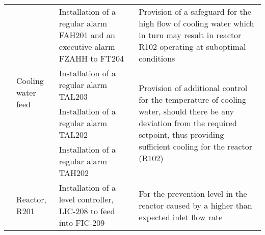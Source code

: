 \begin{table}[h]
\begin{tabularx}{\linewidth}{@{}lp{3cm}XX@{}}
     & \multirow[t]{4}{*}{Cooling water feed}        & Installation of a regular alarm FAH201 and an executive alarm FZAHH to FT204                                                                                  & Provision of a safeguard for the high flow of cooling water which in turn may result in   reactor R102 operating at suboptimal conditions                                                                 \\ \cmidrule(l){3-4} 
     &                                            & Installation of a regular alarm TAL203                                                                                                                        & \multirow[t]{3}{X}{Provision of additional control for the temperature of cooling water, should there be any deviation from the required setpoint, thus providing sufficient cooling for the reactor (R102)} \\ \cmidrule(lr){3-3}
     &                                            & Installation of a regular alarm TAL202                                                                                                                        &                                                                                                                                                                                                                                                         \\
     &                                            & Installation of a regular alarm TAH202                                                                                                                        &                                                                                                                                                                                                                                                         \\ \cmidrule(l){2-4} 
     & \multirow[t]{5}{*}{Reactor, R201}             & \multirow[t]{2}{X}{Installation of a level controller, LIC-208 to feed into FIC-209}                                                                             & \multirow[t]{2}{X}{For the prevention level in the reactor caused by a higher than expected inlet flow rate}                                                                                                     \\
     &                                            &                                                                                                                                                               &                                                                                                                                                                                                                                                         \\ \cmidrule(l){3-4} 

\end{tabularx}
\end{table}

